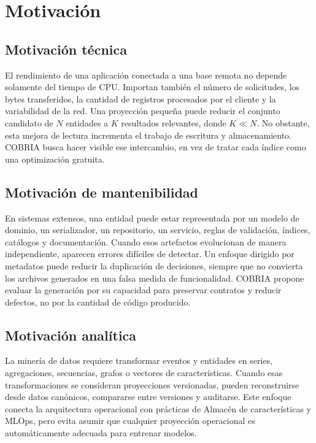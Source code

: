 \section{Motivación}

\subsection{Motivación técnica}

El rendimiento de una aplicación conectada a una base remota no depende solamente del
tiempo de CPU. Importan también el número de solicitudes, los bytes transferidos, la
cantidad de registros procesados por el cliente y la variabilidad de la red. Una
proyección pequeña puede reducir el conjunto candidato de $N$ entidades a $K$
resultados relevantes, donde $K \ll N$. No obstante, esta mejora de lectura incrementa
el trabajo de escritura y almacenamiento. COBRIA busca hacer visible ese intercambio,
en vez de tratar cada índice como una optimización gratuita.

\subsection{Motivación de mantenibilidad}

En sistemas extensos, una entidad puede estar representada por un modelo de dominio, un
serializador, un repositorio, un servicio, reglas de validación, índices, catálogos y
documentación. Cuando esos artefactos evolucionan de manera independiente, aparecen
errores difíciles de detectar. Un enfoque dirigido por metadatos puede reducir la
duplicación de decisiones, siempre que no convierta los archivos generados en una falsa
medida de funcionalidad. COBRIA propone evaluar la generación por su capacidad para
preservar contratos y reducir defectos, no por la cantidad de código producido.

\subsection{Motivación analítica}

La minería de datos requiere transformar eventos y entidades en series, agregaciones,
secuencias, grafos o vectores de características. Cuando esas transformaciones se
consideran proyecciones versionadas, pueden reconstruirse desde datos canónicos,
compararse entre versiones y auditarse. Este enfoque conecta la arquitectura operacional
con prácticas de Almacén de características y MLOps, pero evita asumir que cualquier proyección
operacional es automáticamente adecuada para entrenar modelos.

